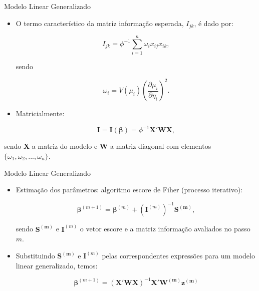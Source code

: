 \documentclass[10pt, aspectratio=169]{beamer}
\begin{document}
\begin{frame}{Modelo Linear Generalizado}

\begin{itemize}

     \item O termo característico da matriz informação esperada, $I_{jk}$, é dado por:
     
     $$
         I_{jk}=\phi^{-1} \sum_{i=1}^{n}\omega_{i}x_{ij}x_{ik},
     $$

sendo 

$$
    \omega_{i}=V(\mu_{i})\left ( \frac{\partial \mu_{i}}{\partial \eta_{i}} \right )^{2}.
$$

     \item Matricialmente:
     
$$
      \boldsymbol{I}=   \boldsymbol{I}(\boldsymbol{\beta})=\phi^{-1}\boldsymbol{X'WX},
$$
\end{itemize}

sendo $\boldsymbol{X}$ a matriz do modelo e $\boldsymbol{W}$ a matriz diagonal com elementos $\{\omega_{1}, \omega_{2}, ..., \omega_{n}\}$.

\end{frame}




\begin{frame}{Modelo Linear Generalizado} 

\begin{itemize}

\item Estimação dos parâmetros: algoritmo escore de Fiher (processo iterativo):

  \vspace{0,5cm}

$$
    \boldsymbol{\beta}^{(m+1)}=\boldsymbol{\beta}^{(m)}+(\boldsymbol{I}^{(m)})^{-1}\boldsymbol{S^{(m)}},
$$

  \vspace{0,5cm}

sendo $\boldsymbol{S^{(m)}}$ e $\boldsymbol{I}^{(m)}$ o vetor escore e a matriz informação avaliados no passo $m$.

  \vspace{0,5cm}
  
\item Substituindo $\boldsymbol{S^{(m)}}$ e $\boldsymbol{I}^{(m)}$ pelas correspondentes expressões para um modelo linear generalizado, temos:

$$
    \boldsymbol{\beta}^{(m+1)}=(\boldsymbol{X'WX})^{-1}\boldsymbol{X'W^{(m)}z^{(m)}}
$$


\end{itemize}
\end{frame}
\end{document}

